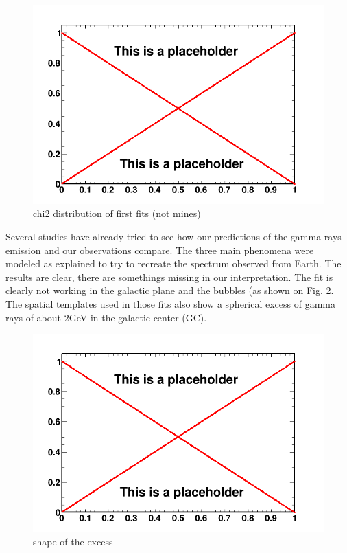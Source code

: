 \begin{figure}
 \centering
 \includegraphics[width=.9\linewidth]{pic/dummy.png}
 \caption{chi2 distribution of first fits (not mines)}
 \label{fig:first_BKGonly_fits}
\end{figure}

Several studies have already tried to see how our predictions of the gamma rays emission and our observations compare. The three main phenomena were modeled as explained to try to recreate the spectrum observed from Earth. The results are clear, there are somethings missing in our interpretation. 
The fit is clearly not working in the galactic plane and the bubbles (as shown on Fig. \ref{fig:first_BKGonly_fits}. The spatial templates used in those fits also show a spherical excess of gamma rays of about 2GeV in the galactic center (GC).

\begin{figure}
 \centering
 \includegraphics[width=.9\linewidth]{pic/dummy.png}
 \caption{shape of the excess}
 \label{fig:first_BKGonly_fits}
\end{figure}


